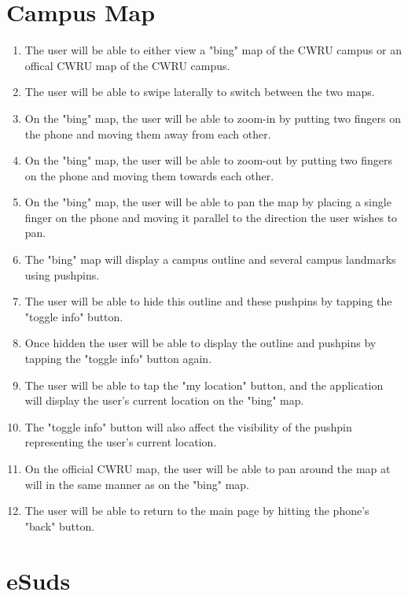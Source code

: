 \documentclass[pdftex,12pt,letter]{article}
\begin{document}
\section{Campus Map}
\begin{enumerate}[1.]
\item The user will be able to either view a "bing" map of the CWRU campus or an offical CWRU map of the CWRU campus.
\item The user will be able to swipe laterally to switch between the two maps.
\item On the "bing" map, the user will be able to zoom-in by putting two fingers on the phone and moving them away from each other.
\item On the "bing" map, the user will be able to zoom-out by putting two fingers on the phone and moving them towards each other.
\item On the "bing" map, the user will be able to pan the map by placing a single finger on the phone and moving it parallel to the direction the user wishes to pan.
\item The "bing" map will display a campus outline and several campus landmarks using pushpins.
\item The user will be able to hide this outline and these pushpins by tapping the "toggle info" button.
\item Once hidden the user will be able to display the outline and pushpins by tapping the "toggle info" button again.
\item The user will be able to tap the "my location" button, and the application will display the user's current location on the "bing" map.
\item The "toggle info" button will also affect the visibility of the pushpin representing the user's current location.
\item On the official CWRU map, the user will be able to pan around the map at will in the same manner as on the "bing" map.
\item The user will be able to return to the main page by hitting the phone's "back" button.
\end{enumerate}
\section{eSuds}
\end{document}
